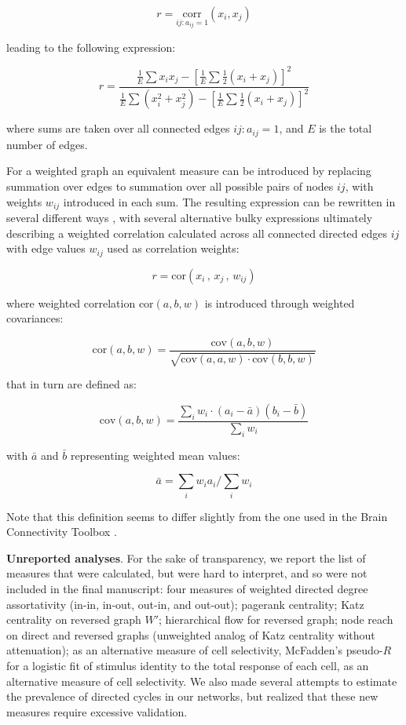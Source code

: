 \documentclass{article}
\begin{document}
\[ r=\underset{ij: a_{ij}=1}{\text{corr}}(x_i,x_j) \]

leading to the following expression:

\[ r = \frac{\frac{1}{E} \sum{x_i x_j} - [\frac{1}{E} \sum{\frac{1}{2}(x_i+x_j)}]^2} {\frac{1}{E} \sum{(x_i^2+x_j^2)}-[\frac{1}{E} \sum{\frac{1}{2}(x_i+x_j)}]^2} \]

where sums are taken over all connected edges $ij: a_{ij}=1$, and $E$ is the total number of edges.

For a weighted graph an equivalent measure can be introduced by replacing summation over edges to summation over all possible pairs of nodes $ij$, with weights $w_{ij}$ introduced in each sum. The resulting expression can be rewritten in several different ways \citep{newman2003mixing,leung2007weighted,farine2014weighted,teller2014assortative}, with several alternative bulky expressions ultimately describing a weighted correlation calculated across all connected directed edges $ij$ with edge values $w_{ij}$ used as correlation weights:

\[ r=\text{cor}(x_i \, , \, x_j \, , \, w_{ij}) \]

where weighted correlation $\text{cor}(a,b,w)$ is introduced through weighted covariances: 

\[ \text{cor}(a,b,w) = \frac{\text{cov}(a,b,w)}{\sqrt{\text{cov}(a,a,w) \cdot \text{cov}(b,b,w)}} \]

that in turn are defined as: 

\[ \text{cov}(a,b,w) = \frac{\sum_i{w_i \cdot (a_i-\bar{a})(b_i-\bar{b})}}{\sum_i{w_i}} \]

with $\bar{a}$ and $\bar{b}$ representing weighted mean values: 

\[ \bar{a}=\sum_i{w_i a_i}/\sum_i{w_i} \]

Note that this definition seems to differ slightly from the one used in the Brain Connectivity Toolbox \citep{rubinov2010toolbox}.

\textbf{Unreported analyses}. For the sake of transparency, we report the list of measures that were calculated, but were hard to interpret, and so were not included in the final manuscript: four measures of weighted directed degree assortativity (in-in, in-out, out-in, and out-out); pagerank centrality; Katz centrality on reversed graph $W'$; hierarchical flow for reversed graph; node reach on direct and reversed graphs (unweighted analog of Katz centrality without attenuation); as an alternative measure of cell selectivity, McFadden’s pseudo-$R$ for a logistic fit of stimulus identity to the total response of each cell, as an alternative measure of cell selectivity. We also made several attempts to estimate the prevalence of directed cycles in our networks, but realized that these new measures require excessive  validation.
\end{document}
